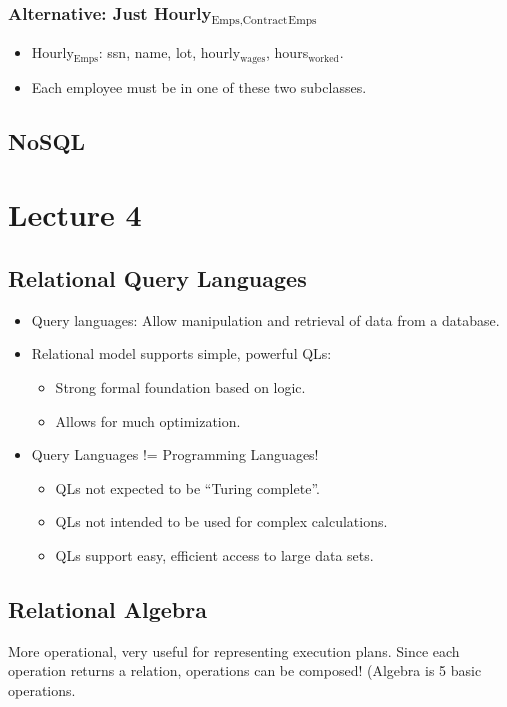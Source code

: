 \documentclass[11pt]{article}
\begin{document}
\subsubsection{Alternative: Just Hourly\(_{\text{Emps,Contract}}\)\(_{\text{Emps}}\)}
\label{sec:org2c826b6}
\begin{itemize}
\item Hourly\(_{\text{Emps}}\): ssn, name, lot, hourly\(_{\text{wages}}\), hours\(_{\text{worked}}\).
\item Each employee must be in one of these two subclasses.
\end{itemize}
\subsection{NoSQL}
\label{sec:orgc1a3865}
\section{Lecture 4}
\label{sec:org79f8f96}
\subsection{Relational Query Languages}
\label{sec:org23c5707}
\begin{itemize}
\item Query languages: Allow manipulation and retrieval of data from a database.
\item Relational model supports simple, powerful QLs:
\begin{itemize}
\item Strong formal foundation based on logic.
\item Allows for much optimization.
\end{itemize}
\item Query Languages != Programming Languages!
\begin{itemize}
\item QLs not expected to be “Turing complete”.
\item QLs not intended to be used for complex calculations.
\item QLs support easy, efficient access to large data sets.
\end{itemize}
\end{itemize}
\subsection{Relational Algebra}
\label{sec:org9bdc6b6}
More operational, very useful for representing execution plans.
Since each operation returns a relation, operations can be composed! (Algebra is
5 basic operations.
\end{document}
